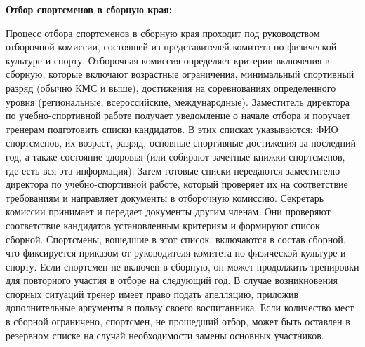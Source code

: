 \documentclass[12pt,a4paper,final]{article} %
\begin{document}
\par \textbf{Отбор спортсменов в сборную края:} 
\par Процесс отбора спортсменов в сборную края проходит под руководством отборочной комиссии, состоящей из представителей комитета по физической культуре и спорту. Отборочная комиссия определяет критерии включения в сборную, которые включают возрастные ограничения, минимальный спортивный разряд (обычно КМС и выше), достижения на соревнованиях определенного уровня (региональные, всероссийские, международные). Заместитель директора по учебно-спортивной работе получает уведомление о начале отбора и поручает тренерам подготовить списки кандидатов. В этих списках указываются: ФИО спортсменов, их возраст, разряд, основные спортивные достижения за последний год, а также состояние здоровья (или собирают зачетные книжки спортсменов, где есть вся эта информация). Затем готовые списки передаются заместителю директора по учебно-спортивной работе, который проверяет их на соответствие требованиям и направляет документы в отборочную комиссию. Секретарь комиссии принимает и передает документы другим членам. Они проверяют соответствие кандидатов установленным критериям и формируют список сборной. Спортсмены, вошедшие в этот список, включаются в состав сборной, что фиксируется приказом от руководителя комитета по физической культуре и спорту. Если спортсмен не включен в сборную, он может продолжить тренировки для повторного участия в отборе на следующий год. В случае возникновения спорных ситуаций тренер имеет право подать апелляцию, приложив дополнительные аргументы в пользу своего воспитанника. Если количество мест в сборной ограничено, спортсмен, не прошедший отбор, может быть оставлен в резервном списке на случай необходимости замены основных участников.\\
\end{document}
